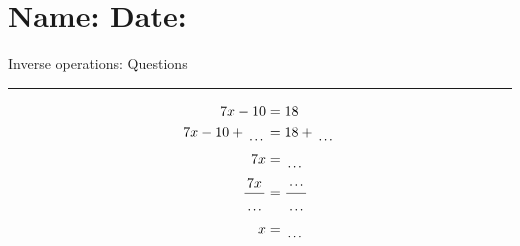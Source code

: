 \documentclass[12pt]{article}
\def \HeadingQuestions {\section*{\Large Name: \underline{\hspace{8cm}} \hfill Date: \underline{\hspace{3cm}}} \vspace{-3mm}
{Inverse operations: Questions} \vspace{1pt}\hrule}
\newcounter{minipagecount}
\begin{document}
\HeadingQuestions
\vspace{1mm}
\begin{multicols}{2}
\noindent{(\theminipagecount)}\hspace{0.1mm} %
\begin{minipage}[t]{0.45\textwidth} %
    \vspace{-26pt}  %
    \raggedright %
    \begin{align*} %
        7x - 10 &= 18\\
        7x - 10 + \dotuline{\hspace{5mm}} &= 18 + \dotuline{\hspace{5mm}}\\
        7x &= \dotuline{\hspace{5mm}}\\
        \frac{7x}{\dotuline{\hspace{5mm}}} &= \frac{\dotuline{\hspace{5mm}}}{\dotuline{\hspace{5mm}}}\\
        x &= \dotuline{\hspace{5mm}}\\
    \end{align*}
\end{minipage} %
\noindent{(\theminipagecount)}\hspace{0.1mm} %
\begin{minipage}[t]{0.45\textwidth} %
    \vspace{-26pt}  %

\end{minipage}
\end{multicols}
\end{document}
